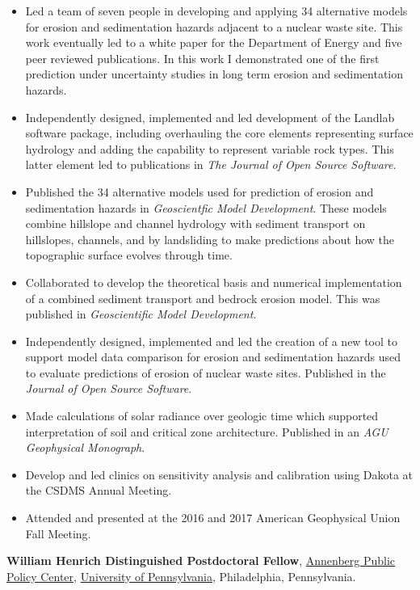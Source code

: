 \documentclass[10pt]{article}
\begin{document}
\begin{itemize}
\item Led a team of seven people in developing and applying 34 alternative models for erosion and sedimentation hazards adjacent to a nuclear waste site. This work eventually led to a white paper for the Department of Energy and five peer reviewed publications. In this work I demonstrated one of the first prediction under uncertainty studies in long term erosion and sedimentation hazards.
\item Independently designed, implemented and led development of the Landlab software package, including overhauling the core elements representing surface hydrology and adding the capability to represent variable rock types. This latter element led to publications in \textit{The Journal of Open Source Software}.
\item Published the 34 alternative models used for prediction of erosion and sedimentation hazards in \textit{Geoscientfic Model Development}. These models combine hillslope and channel hydrology with sediment transport on hillslopes, channels, and by landsliding to make predictions about how the topographic surface evolves through time. 
\item Collaborated to develop the theoretical basis and numerical implementation of a combined sediment transport and bedrock erosion model. This was published in \textit{Geoscientific Model Development}.
\item Independently designed, implemented and led the creation of a new tool to support model data comparison for erosion and sedimentation hazards used to evaluate predictions of erosion of nuclear waste sites. Published in the \textit{Journal of Open Source Software}.
\item Made calculations of solar radiance over geologic time which supported interpretation of soil and critical zone architecture. Published in an \textit{AGU Geophysical Monograph}. 
\item Develop and led clinics on sensitivity analysis and calibration using Dakota at the CSDMS Annual Meeting. 
\item Attended and presented at the 2016 and 2017 American Geophysical Union Fall Meeting. 
\end{itemize} 

\textbf{William Henrich Distinguished Postdoctoral Fellow}, \href{http://www.annenbergpublicpolicycenter.org/}{{Annenberg Public Policy Center}}, \href{http://www.upenn.edu}{{University of Pennsylvania}}, Philadelphia, Pennsylvania. 
\end{document}
